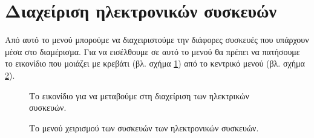 \documentclass[a4paper,titlepage,twoside,12pt,leqno]{article}
\begin{document}
\newpage

\section{Διαχείριση ηλεκτρονικών συσκευών}
\label{syskeuves}

Από αυτό το μενού μπορούμε να διαχειριστούμε την διάφορες συσκευές που υπάρχουν μέσα στο διαμέρισμα. Για να εισέλθουμε σε αυτό το μενού θα πρέπει να πατήσουμε το εικονίδιο που μοιάζει με κρεβάτι (βλ. σχήμα \ref{fig:icon:room}) από το κεντρικό μενού (βλ. σχήμα \ref{fig:menu:room}).

\begin{figure}
\begin{center}
\caption{Το εικονίδιο για να μεταβούμε στη διαχείριση των ηλεκτρικών συσκευών.}
\label{fig:icon:room}
\end{center}
\end{figure}

\begin{figure}
\begin{center}
\caption{Το μενού χειρισμού των συσκευών των ηλεκτρονικών συσκευών.}
\label{fig:menu:room}
\end{center}
\end{figure}
\end{document}
